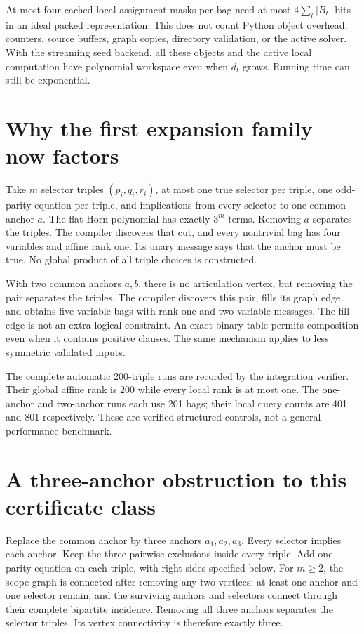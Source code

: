 \documentclass[11pt]{article}
\begin{document}
At most four cached local assignment masks per bag need at most
\(4\sum_t|B_t|\) bits in an ideal packed representation. This does not count
Python object overhead, counters, source buffers, graph copies, directory
validation, or the active solver. With the streaming seed backend, all these
objects and the active local computation have polynomial workspace even
when \(d_t\) grows. Running time can still be exponential.

\section{Why the first expansion family now factors}
Take \(m\) selector triples \((p_i,q_i,r_i)\), at most one true selector
per triple, one odd-parity equation per triple, and implications from every
selector to one common anchor \(a\). The flat Horn polynomial has exactly
\(3^m\) terms. Removing \(a\) separates the triples. The compiler discovers
that cut, and every nontrivial bag has four variables and affine rank one.
Its unary message says that the anchor must be true. No global product of
all triple choices is constructed.

With two common anchors \(a,b\), there is no articulation vertex, but
removing the pair separates the triples. The compiler discovers this pair,
fills its graph edge, and obtains five-variable bags with rank one and
two-variable messages. The fill edge is not an extra logical constraint.
An exact binary table permits composition even when it contains positive
clauses. The same mechanism applies to less symmetric validated inputs.

The complete automatic 200-triple runs are recorded by the integration
verifier. Their global affine rank is 200 while every local rank is at most
one. The one-anchor and two-anchor runs each use 201 bags; their local query
counts are 401 and 801 respectively. These are verified structured controls,
not a general performance benchmark.

\section{A three-anchor obstruction to this certificate class}
Replace the common anchor by three anchors \(a_1,a_2,a_3\). Every selector
implies each anchor. Keep the three pairwise exclusions inside every triple.
Add one parity equation on each triple, with right sides specified below.
For \(m\ge2\), the scope graph is connected after removing any two vertices:
at least one anchor and one selector remain, and the surviving anchors and
selectors connect through their complete bipartite incidence. Removing all
three anchors separates the selector triples. Its vertex connectivity is
therefore exactly three.
\end{document}
